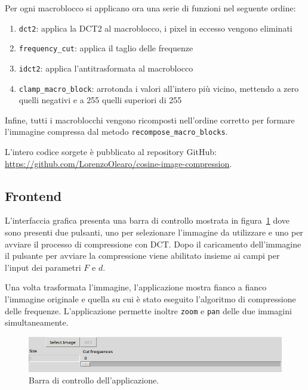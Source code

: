 \documentclass[a4paper, 12pt]{article}
\renewenvironment{shaded}{%
  \def\FrameCommand{\fboxsep=\FrameSep \colorbox{shadecolor}}%
  \MakeFramed{\advance\hsize-\width \FrameRestore\FrameRestore}}%
 {\endMakeFramed}
\begin{document}
Per ogni macroblocco si applicano ora una serie di funzioni nel seguente ordine:
\begin{enumerate}
  \item \texttt{dct2}: applica la DCT2 al macroblocco, i pixel in eccesso
    vengono eliminati
  \item \texttt{frequency\_cut}: applica il taglio delle frequenze
  \item \texttt{idct2}: applica l'antitrasformata al macroblocco
  \item \texttt{clamp\_macro\_block}: arrotonda i valori all'intero più vicino,
    mettendo a zero quelli negativi e a 255 quelli superiori di 255
\end{enumerate}

Infine, tutti i macroblocchi vengono ricomposti nell'ordine corretto per formare
l'immagine compressa dal metodo \texttt{recompose\_macro\_blocks}.

\begin{shaded}
  \centering
  L'intero codice sorgete è pubblicato al repository GitHub: \\
  \url{https://github.com/LorenzoOlearo/cosine-image-compression}.

\end{shaded}


\subsection{Frontend}
L'interfaccia grafica presenta una barra di controllo mostrata in 
figura~\ref{fig:control-bar} dove sono presenti due pulsanti, uno per 
selezionare l'immagine da utilizzare e uno per avviare il processo di 
compressione con DCT. Dopo il caricamento dell'immagine il pulsante per avviare 
la compressione viene abilitato insieme ai campi per l'input dei parametri 
$F$ e $d$.

Una volta trasformata l'immagine, l'applicazione mostra fianco a fianco
l'immagine originale e quella su cui è stato eseguito l'algoritmo di
compressione delle frequenze. L'applicazione permette inoltre \texttt{zoom} e
\texttt{pan} delle due immagini simultaneamente.

\begin{figure}[h]
  \includegraphics[width=\textwidth]{./imgs/control-bar.png}
  \caption{Barra di controllo dell'applicazione.}
  \label{fig:control-bar}
\end{figure}
\end{document}
